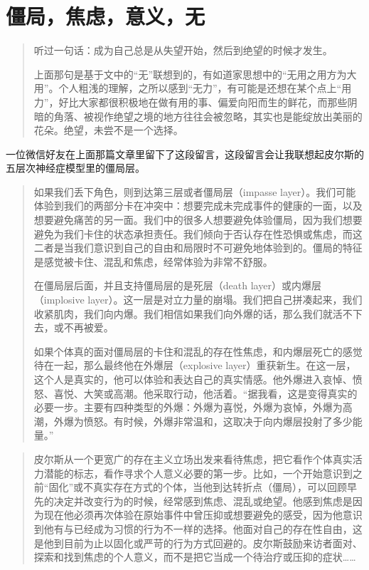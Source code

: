 \chapter{僵局，焦虑，意义，无}






\blockquote{
	听过一句话：成为自己总是从失望开始，然后到绝望的时候才发生。

	上面那句是基于文中的“无”联想到的，有如道家思想中的“无用之用方为大用”。个人粗浅的理解，之所以感到“无力”，有可能是还想在某个点上“用力”，好比大家都很积极地在做有用的事、偏爱向阳而生的鲜花，而那些阴暗的角落、被视作绝望之境的地方往往会被忽略，其实也是能绽放出美丽的花朵。绝望，未尝不是一个选择。
}


一位微信好友在上面那篇文章里留下了这段留言，这段留言会让我联想起皮尔斯的五层次神经症模型里的僵局层。

\blockquote{
	如果我们丢下角色，则到达第三层或者僵局层（impasse layer）。我们可能体验到我们的两部分卡在冲突中：想要完成未完成事件的健康的一面，以及想要避免痛苦的另一面。我们中的很多人想要避免体验僵局，因为我们想要避免为我们卡住的状态承担责任。我们倾向于否认存在性恐惧或焦虑，而这二者是当我们意识到自己的自由和局限时不可避免地体验到的。僵局的特征是感觉被卡住、混乱和焦虑，经常体验为非常不舒服。

	在僵局层后面，并且支持僵局层的是死层（death layer）或内爆层（implosive layer）。这一层是对立力量的崩塌。我们把自己拼凑起来，我们收紧肌肉，我们向内爆。我们相信如果我们向外爆的话，那么我们就活不下去，或不再被爱。

	如果个体真的面对僵局层的卡住和混乱的存在性焦虑，和内爆层死亡的感觉待在一起，那么最终他在外爆层（explosive layer）重获新生。在这一层，这个人是真实的，他可以体验和表达自己的真实情感。他外爆进入哀悼、愤怒、喜悦、大笑或高潮。他采取行动，他活着。“据我看，这是变得真实的必要一步。主要有四种类型的外爆：外爆为喜悦，外爆为哀悼，外爆为高潮，外爆为愤怒。有时候，外爆非常温和，这取决于向内爆层投射了多少能量。”

}

\blockquote{
	皮尔斯从一个更宽广的存在主义立场出发来看待焦虑，把它看作个体真实活力潜能的标志，看作寻求个人意义必要的第一步。比如，一个开始意识到之前“固化”或不真实存在方式的个体，当他到达转折点（僵局），可以回顾早先的决定并改变行为的时候，经常感到焦虑、混乱或绝望。他感到焦虑是因为现在他必须再次体验在原始事件中曾压抑或想要避免的感受，因为他意识到他有与已经成为习惯的行为不一样的选择。他面对自己的存在性自由，这是他到目前为止以固化或严苛的行为方式回避的。皮尔斯鼓励来访者面对、探索和找到焦虑的个人意义，而不是把它当成一个待治疗或压抑的症状……

}

